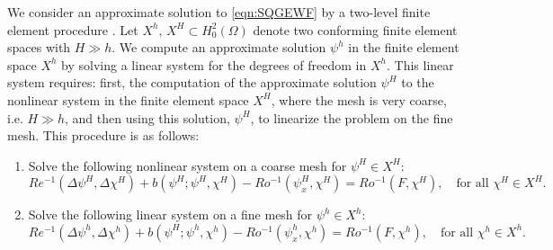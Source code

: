 We consider an approximate solution to \eqref{eqn:SQGEWF} by a two-level finite
element procedure \cite{Fairag98,Layton93}. Let $X^h,\, X^H \subset
H^2_0(\Omega)$ denote two conforming finite element spaces with $H \gg h$. We
compute an approximate solution $\psi^h$ in the finite element space $X^h$ by
solving a linear system for the degrees of freedom in $X^h$.  This
linear system requires: first, the computation of the approximate solution $\psi^H$ to
the nonlinear system in the finite element space $X^H$, where the mesh is very
coarse, i.e. $H \gg h$, and then using this solution, $\psi^H$, to linearize the
problem on the fine mesh. This procedure is as follows:

\begin{algorithm}%
  \caption{}%
  \label{alg:TwoLevel}
  \begin{enumerate}[Step 1:]
    \item Solve the following nonlinear system on a coarse mesh for $\psi^H\in X^H$:
    \begin{equation}
      Re^{-1} (\Delta \psi^H, \Delta \chi^H)
        + b(\psi^H; \psi^H,\chi^H)
        - Ro^{-1} (\psi_x^H,\chi^H)
        = Ro^{-1} (F,\chi^H), \quad \text{for all } \chi^H \in X^H.
      \label{eqn:Coarse}
    \end{equation}
    \item Solve the following linear system on a fine mesh for $\psi^h\in X^h$:
    \begin{equation}
      Re^{-1} (\Delta \psi^h, \Delta \chi^h)
        + b(\psi^H; \psi^h,\chi^h)
        - Ro^{-1} (\psi_x^h,\chi^h)
        = Ro^{-1} (F,\chi^h), \quad \text{for all } \chi^h \in X^h.
      \label{eqn:Fine}
    \end{equation}
  \end{enumerate}
\end{algorithm}
